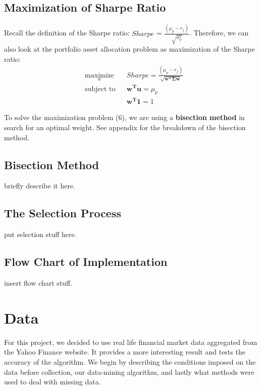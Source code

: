 \documentclass[12pt]{article}
\begin{document}
\subsection{Maximization of Sharpe Ratio}
Recall the definition of the Sharpe ratio: $Sharpe$ = $\frac{(\mu_p - r_f)}{\sqrt{\sigma_p^2}}$. Therefore, we can also look at the portfolio asset allocation problem as maximization of the Sharpe ratio: 
\begin{equation}
\begin{aligned}
& \underset{w}{\text{maximize}}
& & Sharpe = \frac{(\mu_p - r_f)}{\sqrt{\mathbf{w^T\Sigma w}}} \\
& \text{subject to}
& & \mathbf{w^Tu} = \mu_p \\
&&& \mathbf{w^T1}=1
\end{aligned}
\end{equation}

To solve the maximization problem (6), we are using a \textbf{bisection method} in search for an optimal weight. See appendix for the breakdown of the bisection method.  

\subsection{Bisection Method}
briefly describe it here.

\subsection{The Selection Process}
put selection stuff here.

\subsection{Flow Chart of Implementation}
insert flow chart stuff. 

\section{Data}
For this project, we decided to use real life financial market data aggregated from the Yahoo Finance website. It provides a more interesting result and tests the accuracy of the algorithm. We begin by describing the conditions imposed on the data before collection, our data-mining algorithm, and lastly what methods were used to deal with missing data.
\end{document}
